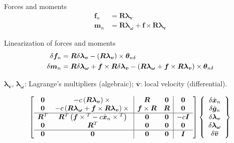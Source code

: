 \documentclass{article}
\newcommand{\T}[1]{\bm{#1}}
\newcommand{\TT}[1]{\bm{#1}}
\begin{document}
Forces and moments
\begin{subequations}
\begin{align}
	\T{f}_n
	&=
	\TT{R} \T{\lambda}_{\T{v}}
	\\
	\T{m}_n
	&=
	\TT{R} \T{\lambda}_{\T{\omega}}
	+
	\T{f} \times \TT{R} \T{\lambda}_{\T{v}}
\end{align}
\end{subequations}

Linearization of forces and moments
\begin{subequations}
\begin{align}
	\delta\T{f}_n
	&=
	\TT{R} \delta \T{\lambda}_{\T{v}}
	- \plbr{\TT{R} \T{\lambda}_{\T{v}}} \times \T{\theta}_{n\delta}
	\\
	\delta \T{m}_n
	&=
	\TT{R} \delta \T{\lambda}_{\T{\omega}}
	+
	\T{f} \times \TT{R} \delta \T{\lambda}_{\T{v}}
	-
	\plbr{
		\TT{R} \T{\lambda}_{\T{\omega}}
		+
		\T{f} \times \TT{R} \T{\lambda}_{\T{v}}
	} \times \T{\theta}_{n\delta}
\end{align}
\end{subequations}

$\T{\lambda}_{\T{v}}$, $\T{\lambda}_{\T{\omega}}$: Lagrange's multipliers (algebraic);
$\overline{\T{v}}$: local velocity (differential).

\begin{align}
	\sqbr{\matr{cc|cc|c}{
		\TT{0} & -c\plbr{\TT{R} \T{\lambda}_{\T{v}}}\times{}
			& \TT{R} & \TT{0} & \TT{0}
		\\
		\TT{0} & -c\plbr{\TT{R} \T{\lambda}_{\T{\omega}} + \T{f}\times\TT{R} \T{\lambda}_{\T{v}}}\times{}
			& \T{f}\times\TT{R} & \TT{R} & \TT{0}
		\\
		\hline
		\TT{R}^T & \TT{R}^T \plbr{\T{f}\times{}^T - c \dot{\T{x}}_n\times{}^T}
			& \TT{0} & \TT{0} & -c \TT{I}
		\\
		\TT{0} & \TT{R}^T & \TT{0} & \TT{0} & \TT{0}
		\\
		\hline
		\TT{0} & \TT{0} & \TT{0} & \TT{0} & \TT{I}
	}} \cubr{\cvvect{
		\delta\dot{\T{x}}_n
		\\
		\delta\dot{\T{g}}_n
		\\
		\delta \T{\lambda}_{\T{v}}
		\\
		\delta \T{\lambda}_{\T{\omega}}
		\\
		\delta\overline{\T{v}}
	}}
\end{align}
\end{document}
